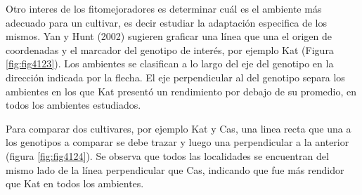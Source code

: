 Otro interes de los fitomejoradores es determinar cuál es el ambiente más adecuado para un cultivar, es decir estudiar la adaptación especifica de los mismos. Yan y Hunt (2002) sugieren graficar una línea que una el origen de coordenadas y el marcador del genotipo de interés, por ejemplo Kat (Figura \ref{fig:fig4123}). Los ambientes se clasifican a lo largo del eje del genotipo en la dirección indicada por la flecha. El eje perpendicular al del genotipo separa los ambientes en los que Kat presentó un rendimiento por debajo de su promedio, en todos los ambientes estudiados.


Para comparar dos cultivares, por ejemplo Kat y Cas, una linea recta que una a los genotipos a comparar se debe trazar y luego una perpendicular a la anterior (figura \ref{fig:fig4124}). Se observa que todos las localidades se encuentran del mismo lado de la línea perpendicular que Cas, indicando que fue más rendidor que Kat en todos los ambientes.


